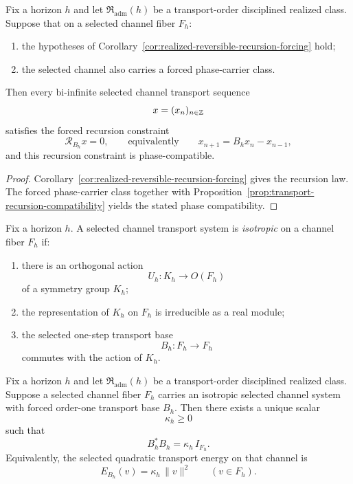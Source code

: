 \begin{corollary}
\label{cor:realized-recursion-forcing}
Fix a horizon $h$ and let $\mathfrak R_{\mathrm{adm}}(h)$ be a transport-order
disciplined realized class. Suppose that on a selected channel fiber $F_h$:
\begin{enumerate}[label=(\roman*), leftmargin=2em, itemsep=0.2em]
\item the hypotheses of
      Corollary~\ref{cor:realized-reversible-recursion-forcing} hold;
\item the selected channel also carries a forced phase-carrier class.
\end{enumerate}
Then every bi-infinite selected channel transport sequence
\[
x=(x_n)_{n\in\mathbb{Z}}
\]
satisfies the forced recursion constraint
\[
\mathcal R_{B_h}x=0,
\qquad\text{equivalently}\qquad
x_{n+1}=B_hx_n-x_{n-1},
\]
and this recursion constraint is phase-compatible.
\end{corollary}

\begin{proof}
Corollary~\ref{cor:realized-reversible-recursion-forcing} gives the recursion
law. The forced phase-carrier class together with
Proposition~\ref{prop:transport-recursion-compatibility} yields the stated
phase compatibility.
\end{proof}

\begin{definition}
\label{def:isotropic-selected-channel-system}
Fix a horizon $h$. A selected channel transport system is \emph{isotropic} on a
channel fiber $F_h$ if:
\begin{enumerate}[label=(\roman*), leftmargin=2em, itemsep=0.2em]
\item there is an orthogonal action
      \[
      U_h:K_h\to O(F_h)
      \]
      of a symmetry group $K_h$;
\item the representation of $K_h$ on $F_h$ is irreducible as a real module;
\item the selected one-step transport base
      \[
      B_h:F_h\to F_h
      \]
      commutes with the action of $K_h$.
\end{enumerate}
\end{definition}

\begin{corollary}
\label{cor:realized-isotropic-quadratic-transport}
Fix a horizon $h$ and let $\mathfrak R_{\mathrm{adm}}(h)$ be a transport-order
disciplined realized class. Suppose a selected channel fiber $F_h$ carries an
isotropic selected channel system with forced order-one transport base $B_h$.
Then there exists a unique scalar
\[
\kappa_h\ge 0
\]
such that
\[
B_h^*B_h=\kappa_h\,I_{F_h}.
\]
Equivalently, the selected quadratic transport energy on that channel is
\[
E_{B_h}(v)=\kappa_h\,\|v\|^2
\qquad(v\in F_h).
\]
\end{corollary}

